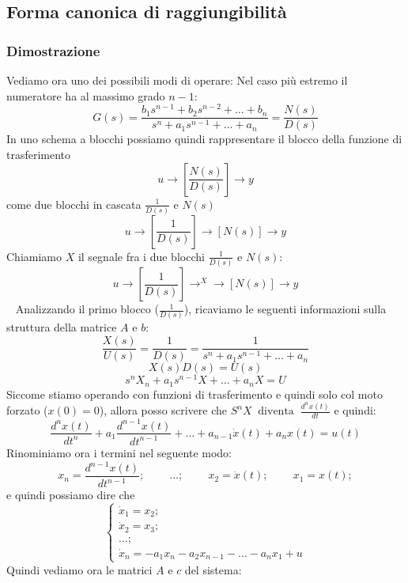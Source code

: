 \subsection{Forma canonica di raggiungibilità}
\subsubsection{Dimostrazione}
Vediamo ora uno dei possibili modi di operare:\newline
Nel caso più estremo il numeratore ha al massimo grado $n-1$:
\[
    G(s) = \frac{ b_1 s^{n-1} + b_2 s^{n-2} + \dots + b_n }{ s^n + a_1 s^{n-1} + \dots + a_n } = \frac{N(s)}{D(s)}
\]
In uno schema a blocchi possiamo quindi rappresentare il blocco della funzione di trasferimento 
\[
    u \rightarrow \left[\frac{N(s)}{D(s)}\right] \rightarrow y
\]
come due blocchi in cascata $\frac{1}{D(s)}$ e $N(s)$
\[
    u \rightarrow \left[\frac{1}{D(s)}\right] \rightarrow \left[N(s)\right] \rightarrow  y
\]
Chiamiamo $X$ il segnale fra i due blocchi $\frac{1}{D(s)}$ e $N(s)$:
\[
    u \rightarrow \left[\frac{1}{D(s)}\right] \rightarrow^X \rightarrow  \left[N(s)\right] \rightarrow  y
\]
\ \newline
Analizzando il primo blocco ($\frac{1}{D(s)}$), ricaviamo le seguenti informazioni sulla struttura della matrice $A$ e $b$:
\[
    \frac{X(s)}{U(s)} = \frac{1}{D(s)} = \frac{1}{ s^n + a_1 s^{n-1} + \dots + a_n }
\]
\[
    X(s) D(s) = U(s)
\]
\[
    s^n X_n + a_1 s^{n-1}X + \dots + a_n X = U
\]
Siccome stiamo operando con funzioni di trasferimento e quindi solo col moto forzato ($x(0) = 0$), allora posso scrivere che $S^n X \;\;\text{diventa}\;\; \frac{d^n x(t)}{dt}$ e quindi:
\[
    \frac{d^n x(t)}{dt^n} + a_1 \frac{d^{n-1} x(t)}{dt^{n-1}} + \dots + a_{n-1} \dot{x}(t) + a_n x(t) = u(t)
\]
Rinominiamo ora i termini nel seguente modo:
\[
    x_n = \frac{d^{n-1} x(t)}{dt^{n-1}}; \;\;\;\;\;\;\;\;\dots; \;\;\;\;\;\;\;\;x_2 = \dot{x}(t); \;\;\;\;\;\;\;\;x_1 = x(t);
\]
e quindi possiamo dire che 
\[
    \begin{cases}
        \dot{x}_1 = x_2;\\
        \dot{x}_2 = x_3;\\
        \dots;\\
        \dot{x}_n = -a_1 x_n - a_2 x_{n-1} - \dots - a_n x_1 + u
    \end{cases}
\]
Quindi vediamo ora le matrici $A$ e $c$ del sistema:
